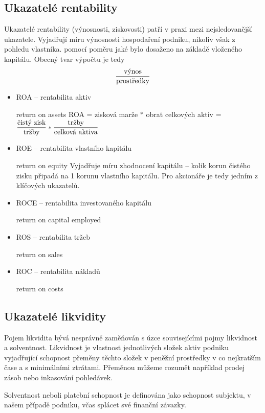 \subsection{Ukazatelé rentability}

Ukazatelé rentability (výnosnosti, ziskovosti) patří v praxi mezi nejsledovanější ukazatele. Vyjadřují míru výnosnosti hospodaření podniku, nikoliv však z pohledu vlastníka. pomocí poměru  jaké bylo dosaženo na základě vloženého kapitálu. Obecný tvar výpočtu je tedy $$\dfrac{\text{výnos}}{\text{prostředky}}$$

\begin{itemize}
\item{ROA -- rentabilita aktiv}

return on assets
ROA = zisková marže $*$ obrat celkových aktiv = $\dfrac{\text{čistý zisk}}{\text{tržby}} * \dfrac{\text{tržby}}{\text{celková aktiva}}$

\item{ROE -- rentabilita vlastního kapitálu}

return on equity
Vyjadřuje míru zhodnocení kapitálu -- kolik korun čistého zisku připadá na 1 korunu vlastního kapitálu. Pro akcionáře je tedy jedním z klíčových ukazatelů.

\item{ROCE -- rentabilita investovaného kapitálu}

return on capital employed

\item{ROS -- rentabilita tržeb}

return on sales

\item{ROC -- rentabilita nákladů}

return on costs
\end{itemize}


\subsection{Ukazatelé likvidity}
Pojem likvidita bývá nesprávně zaměňován s úzce souvisejícími pojmy likvidnost a solventnost. Likvidnost je vlastnost jednotlivých složek aktiv podniku vyjadřující schopnost přeměny těchto složek v peněžní prostředky v co nejkratším čase a s minimálními ztrátami\cite{uk_likv}. Přeměnou můžeme rozumět například prodej zásob nebo inkasování pohledávek. 

Solventnost neboli platební schopnost je definována jako schopnost subjektu, v našem případě podniku, včas splácet své finanční závazky.

